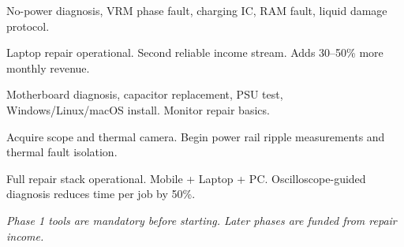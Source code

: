   {No-power diagnosis, VRM phase fault, charging IC, RAM fault, liquid damage protocol.}

  {Laptop repair operational. Second reliable income stream. Adds 30--50\% more monthly revenue.}


  {Motherboard diagnosis, capacitor replacement, PSU test, Windows/Linux/macOS install. Monitor repair basics.}

  {Acquire scope and thermal camera. Begin power rail ripple measurements and thermal fault isolation.}

  {Full repair stack operational. Mobile + Laptop + PC. Oscilloscope-guided diagnosis reduces time per job by 50\%.}

\newpage

{\small\itshape\color{arligray} Phase 1 tools are mandatory before starting. Later phases are funded from repair income.}

